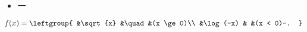 
\begin{issues}
\issueDraft
\end{issues}
\begin{itemize}
\item 一
\end{itemize}
\begin{equation}
f(x) = \leftgroup{
    &\sqrt{x} &\quad &(x \ge 0)\\
    &\log(-x) & &(x < 0)~.
}
\end{equation}


\begin{equation}
\end{equation}~